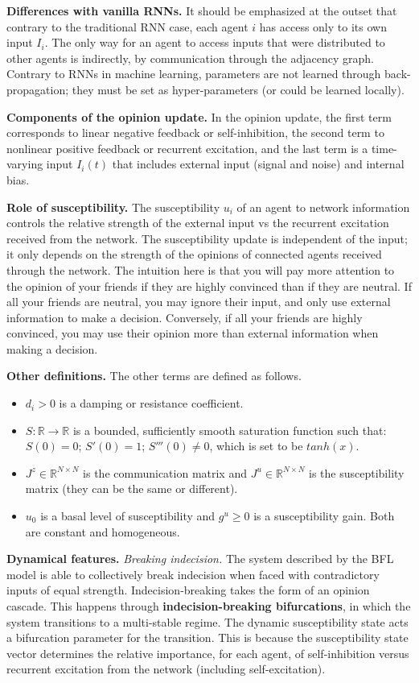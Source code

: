 \documentclass[]{article}
\begin{document}
\textbf{Differences with vanilla RNNs.} It should be emphasized at the outset that contrary to the traditional RNN case, each agent $i$ has access only to its own input $I_i$. The only way for an agent to access inputs that were distributed to other agents is indirectly, by communication through the adjacency graph. Contrary to RNNs in machine learning, parameters are not learned through back-propagation; they must be set as hyper-parameters (or could be learned locally). 

\textbf{Components of the opinion update.} In the opinion update, the first term corresponds to linear negative feedback or self-inhibition, the second term to nonlinear positive feedback or recurrent excitation, and the last term is a time-varying input $I_i(t)$ that includes external input (signal and noise) and internal bias.

\textbf{Role of susceptibility.} The susceptibility $u_i$ of an agent to network information controls the relative strength of the external input vs the recurrent excitation received from the network. The susceptibility update is independent of the input; it only depends on the strength of the opinions of connected agents received through the network. The intuition here is that you will pay more attention to the opinion of your friends if they are highly convinced than if they are neutral. If all your friends are neutral, you may ignore their input, and only use external information to make a decision. Conversely, if all your friends are highly convinced, you may use their opinion more than external information when making a decision.

\textbf{Other definitions.} The other terms are defined as follows. \begin{itemize}
	\item $d_{i} > 0$ is a damping or resistance coefficient. 
	\item $S: \mathbb{R} \rightarrow \mathbb{R}$ is a bounded, sufficiently smooth saturation function such that: $S(0)=0$; $S'(0)=1$; $S'''(0)\neq0$, which is set to be $tanh(x)$.
	\item $J^z \in \mathbb{R}^{N \times N}$ is the communication matrix and $J^u \in \mathbb{R}^{N \times N}$ is the susceptibility matrix (they can be the same or different).
	\item $u_0$ is a basal level of susceptibility and $g^u \geq 0$ is a susceptibility gain. Both are constant and homogeneous.
\end{itemize}

\textbf{Dynamical features.} \textit{Breaking indecision.} The system described by the BFL model is able to collectively break indecision when faced with contradictory inputs of equal strength. Indecision-breaking takes the form of an opinion cascade. This happens through \textbf{indecision-breaking bifurcations}, in which the system transitions to a multi-stable regime. The dynamic susceptibility state acts a bifurcation parameter for the transition. This is because the susceptibility state vector determines the relative importance, for each agent, of self-inhibition versus recurrent excitation from the network (including self-excitation).
\end{document}
